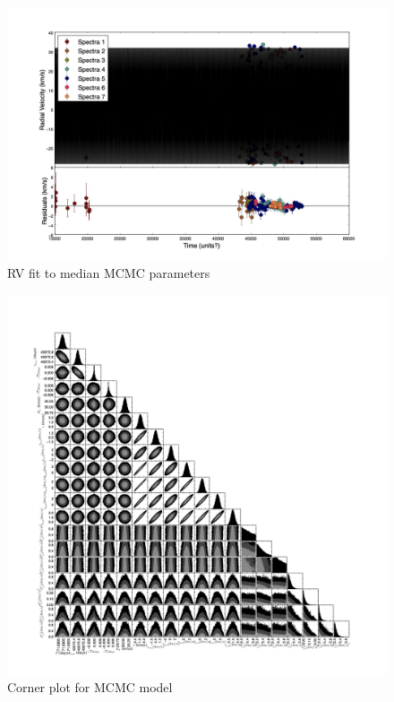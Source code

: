 \documentclass{article}
\begin{document}
\begin{figure}[!htb]
\centering
\includegraphics[width=\textwidth]{RVfit_100000.jpg}
\caption{RV fit to median MCMC parameters}
\end{figure}

\begin{figure}[!htb]
\centering
\includegraphics[width=\textwidth]{corner_100000.jpg}
\caption{Corner plot for MCMC model}
\end{figure}
\end{document}

